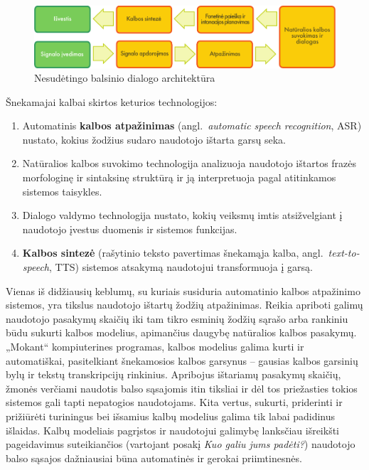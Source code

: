 \begin{multicols}{2}
\begin{figure}[htb]
  \center 
  \includegraphics[width=\textwidth]{../_media/lithuanian/simple_speech-based_dialogue_architecture}
  \caption{Nesudėtingo balsinio dialogo architektūra}
  \label{fig:dialoguearch_de}
\end{figure}

Šnekamajai kalbai skirtos keturios technologijos:

\begin{enumerate}
\item Automatinis \textbf{kalbos atpažinimas} (angl.~\textit{automatic speech recognition}, ASR) nustato, kokius žodžius sudaro naudotojo ištarta garsų seka.
\item Natūralios kalbos suvokimo technologija analizuoja naudotojo ištartos frazės morfologinę ir sintaksinę struktūrą ir ją interpretuoja pagal atitinkamos sistemos taisykles.
\item  Dialogo valdymo technologija nustato, kokių veiksmų imtis atsižvelgiant į naudotojo įvestus duomenis ir sistemos funkcijas.    
\item \textbf{Kalbos sintezė} (rašytinio teksto pavertimas šnekamąja kalba, angl.~\textit{text-to-speech}, TTS) sistemos atsakymą naudotojui transformuoja į garsą.
\end{enumerate}

Vienas iš didžiausių keblumų, su kuriais susiduria automatinio kalbos atpažinimo sistemos, yra tikslus naudotojo ištartų žodžių atpažinimas. Reikia apriboti galimų naudotojo pasakymų skaičių iki tam tikro esminių žodžių sąrašo arba rankiniu būdu sukurti kalbos modelius, apimančius daugybę natūralios kalbos pasakymų. „Mokant“   kompiuterines programas, kalbos modelius galima kurti ir automatiškai, pasitelkiant šnekamosios kalbos garsynus – gausias kalbos garsinių bylų ir tekstų transkripcijų rinkinius. Apribojus ištariamų pasakymų skaičių, žmonės verčiami naudotis balso sąsajomis itin tiksliai ir dėl tos priežasties tokios sistemos gali tapti nepatogios naudotojams. Kita vertus, sukurti, priderinti ir prižiūrėti turiningus bei išsamius kalbų modelius galima tik labai padidinus išlaidas. Kalbų modeliais pagrįstos ir naudotojui galimybę lanksčiau išreikšti pageidavimus suteikiančios (vartojant posakį \textit{Kuo galiu jums padėti?}) naudotojo balso sąsajos dažniausiai būna automatinės ir gerokai priimtinesnės. 


\end{multicols}
